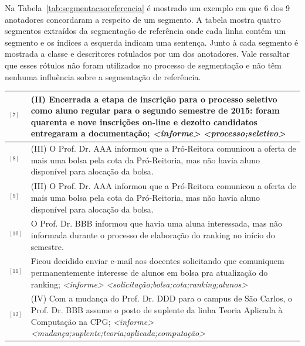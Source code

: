 
Na Tabela~\ref{tab:segmentacaoreferencia} é mostrado um exemplo em que 6 dos 9 anotadores concordaram a respeito de um segmento. A tabela mostra quatro segmentos extraídos da segmentação de referência onde cada linha contém um segmento e os índices a esquerda indicam uma sentença. Junto à cada segmento é mostrada  a classe e descritores rotulados por um dos anotadores. Vale ressaltar que esses rótulos não foram utilizados no processo de segmentação e não têm nenhuma influência sobre a segmentação de referência. %

\begin{table}[!h]
	\centering 
\footnotesize
	\begin{tabular}{|p{0.2cm}p{}|} \hline


$^{[7]}$&
(II) Encerrada a etapa de inscrição para o processo seletivo como aluno regular para o segundo semestre de 2015: foram quarenta e nove inscrições on-line e dezoito candidatos entregaram a documentação; 
\textit{<informe>} \textit{<processo;seletivo>}
\\ \hline


$^{[8]}$ &
(III) O Prof. Dr. AAA informou que a Pró-Reitora comunicou a oferta de mais uma bolsa pela cota da Pró-Reitoria, mas não havia aluno disponível para alocação da bolsa.\\
$^{[9]}$ &
(III) O Prof. Dr. AAA informou que a Pró-Reitora comunicou a oferta de mais uma bolsa pela cota da Pró-Reitoria, mas não havia aluno disponível para alocação da bolsa.\\
$^{[10]}$ &
O Prof. Dr. BBB informou que havia uma aluna interessada, mas não informada durante o processo de elaboração do ranking no início do semestre.\\
$^{[11]}$ &
Ficou decidido enviar e-mail aos docentes solicitando que comuniquem permanentemente interesse de alunos em bolsa pra atualização do ranking;
\textit{<informe>} \textit{<solicitação;bolsa;cota;ranking;alunos>}
\\ \hline


$^{[12]}$ &
(IV) Com a mudança do Prof. Dr. DDD para o campus de São Carlos, o Prof. Dr. BBB assume o posto de suplente da linha Teoria Aplicada à Computação na CPG;
\textit{<informe>} \textit{<mudança;suplente;teoria;aplicada;computação>}
\\ \hline


\end{tabular}
\end{table}
